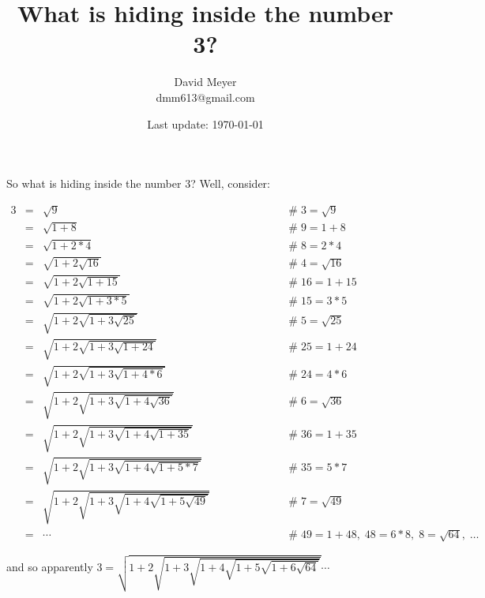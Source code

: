 \documentclass{article}
\title{What is hiding inside the number 3?}
\author{David Meyer \\ dmm613@gmail.com}
\date{Last update: \today}
\theoremstyle{definition}
\begin{document}
\maketitle

\noindent
So what is hiding inside the number 3? Well, consider:

\begin{center}
\begin{equation*}
\begin{array}{llll}
3 
&=&  \sqrt{9}
				&\qquad \qquad \qquad \mathrel{\#} 3 = \sqrt{9} \\
[6pt]
&=&  \sqrt{1 + 8}
				&\qquad \qquad \qquad \mathrel{\#} 9 = 1 + 8 \\
[6pt]
&=&  \sqrt{1 + 2*4}
				&\qquad \qquad \qquad \mathrel{\#} 8 = 2 * 4 \\
[6pt]
&=&  \sqrt{1 + 2 \sqrt{16}}
				&\qquad \qquad \qquad \mathrel{\#} 4 = \sqrt{16}\\
[6pt]
&=&  \sqrt{1 + 2 \sqrt{1 + 15}}
				&\qquad \qquad \qquad \mathrel{\#} 16 = 1 + 15 \\
[6pt]
&=&  \sqrt{1 + 2 \sqrt{1 + 3*5}}
				&\qquad \qquad \qquad \mathrel{\#} 15 = 3 * 5 \\
[6pt]
&=&  \sqrt{1 + 2 \sqrt{1 + 3 \sqrt{25}}}
				&\qquad \qquad \qquad \mathrel{\#} 5 = \sqrt{25} \\
[6pt]
&=&  \sqrt{1 + 2 \sqrt{1 + 3 \sqrt{1 + 24}}}
				&\qquad \qquad \qquad \mathrel{\#} 25 = 1 + 24 \\
[6pt]
&=&  \sqrt{1 + 2 \sqrt{1 + 3 \sqrt{1 + 4*6}}}
				&\qquad \qquad \qquad \mathrel{\#} 24 = 4 * 6 \\
[6pt]
&=&  \sqrt{1 + 2 \sqrt{1 + 3 \sqrt{1 + 4 \sqrt{36}}}}
				&\qquad \qquad \qquad \mathrel{\#} 6 = \sqrt{36}  \\
[6pt]
&=&  \sqrt{1 + 2 \sqrt{1 + 3 \sqrt{1 + 4 \sqrt{1 + 35}}}}
				&\qquad \qquad \qquad \mathrel{\#} 36 = 1 + 35 \\
[6pt]
&=&  \sqrt{1 + 2 \sqrt{1 + 3 \sqrt{1 + 4 \sqrt{1 + 5*7}}}}
				&\qquad \qquad \qquad \mathrel{\#} 35 = 5 * 7 \\
[6pt]
&=&  \sqrt{1 + 2 \sqrt{1 + 3 \sqrt{1 + 4 \sqrt{1 + 5 \sqrt{49}}}}}
				&\qquad \qquad \qquad \mathrel{\#} 7 = \sqrt{49} \\
[6pt]
&=& \cdots
				&\qquad \qquad \qquad \mathrel{\#} 49 = 1 + 48,\; 48 = 6*8, \; 8 = \sqrt{64}, \; \hdots 
\end{array}
\end{equation*}
\end{center}

\bigskip
\noindent
and so apparently $3 = \sqrt{1 + 2 \sqrt{1 + 3 \sqrt{1 + 4  \sqrt{1 + 5 \sqrt{1 + 6 \sqrt{64}}}}}} \cdots$
\end{document}
